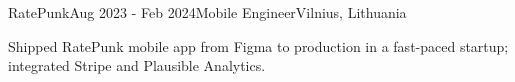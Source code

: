 \begin{rSubsection}{RatePunk}{Aug 2023 - Feb 2024}{Mobile Engineer}{Vilnius, Lithuania}
\item Shipped RatePunk mobile app from Figma to production in a fast-paced startup; integrated Stripe and Plausible Analytics.
\end{rSubsection}
